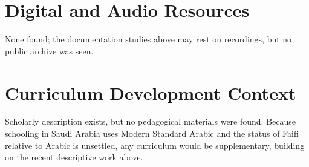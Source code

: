 \documentclass[12pt]{article}
\begin{document}
\section{Digital and Audio Resources}
None found; the documentation studies above may rest on recordings, but no public archive was seen.

\section{Curriculum Development Context}
Scholarly description exists, but no pedagogical materials were found. Because schooling in Saudi Arabia uses Modern Standard Arabic and the status of Faifi relative to Arabic is unsettled, any curriculum would be supplementary, building on the recent descriptive work above.
\end{document}
